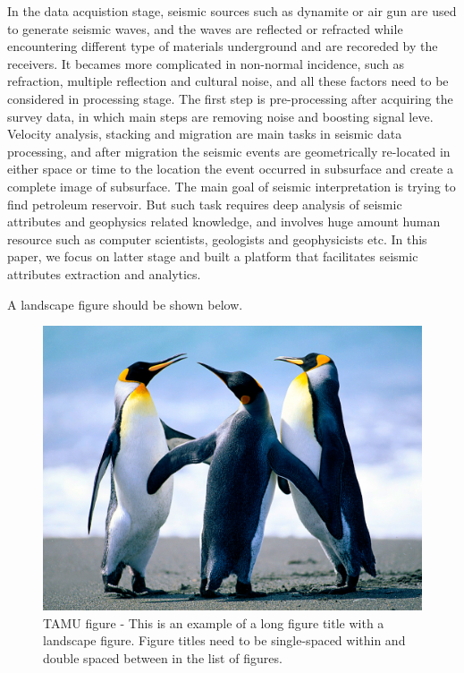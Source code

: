 In the data acquistion stage, seismic sources such as dynamite or air gun are used to generate seismic waves, and the waves are reflected or refracted while encountering different type of materials underground and are recoreded by the receivers. It becames more complicated in non-normal incidence, such as refraction, multiple reflection and cultural noise, and all these factors need to be considered in processing stage. The first step is pre-processing after acquiring the survey data, in which main steps are removing noise and boosting signal leve. Velocity analysis, stacking and migration are main tasks in seismic data processing, and after migration the seismic events are geometrically re-located in either space or time to the location the event occurred in subsurface and create a complete image of subsurface\cite{seisreflection}. The main goal of seismic interpretation is trying to find petroleum reservoir. But such task requires deep analysis of seismic attributes and geophysics related knowledge, and involves huge amount human resource such as computer scientists, geologists and geophysicists etc. In this paper, we focus on latter stage and built a platform that facilitates seismic attributes extraction and analytics.   

A landscape figure should be shown below. 
\begin{figure}
\centering
\includegraphics[scale=.50]{figures/Penguins.jpg}
\caption{TAMU figure - This is an example of a long figure title with a landscape figure.  Figure titles need to be single-spaced within and double spaced between in the list of figures.}
\label{fig:tamu-fig1-1}
\end{figure}

